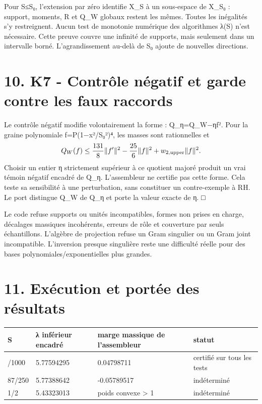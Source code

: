 \documentclass[
  10pt,
  a4paper,
]{article}
\begin{document}
Pour S≤S₀, l'extension par zéro identifie X\_S à un sous-espace de X\_S₀
: support, moments, R et Q\_W globaux restent les mêmes. Toutes les
inégalités s'y restreignent. Aucun test de monotonie numérique des
algorithmes λ(S) n'est nécessaire. Cette preuve couvre une infinité de
supports, mais seulement dans un intervalle borné. L'agrandissement
au-delà de S₀ ajoute de nouvelles directions.

\hypertarget{k7---contruxf4le-nuxe9gatif-et-garde-contre-les-faux-raccords}{%
\section{10. K7 - Contrôle négatif et garde contre les faux
raccords}\label{k7---contruxf4le-nuxe9gatif-et-garde-contre-les-faux-raccords}}

Le contrôle négatif modifie volontairement la forme :
Q\_η=Q\_W−η\textbar\textbar f\textbar\textbar². Pour la graine
polynomiale f=P(1−x²/S₀²)⁴, les masses sont rationnelles et \[
Q_W(f)\le\frac{131}{8}\|f'\|^2-\frac{25}{6}\|f\|^2
+w_{2,\rm upper}\|f\|^2.
\] Choisir un entier η strictement supérieur à ce quotient majoré
produit un vrai témoin négatif encadré de Q\_η. L'assembleur ne certifie
pas cette forme. Cela teste sa sensibilité à une perturbation, sans
constituer un contre-exemple à RH. Le port distingue Q\_W de Q\_η et
porte la valeur exacte de η. □

Le code refuse supports ou unités incompatibles, formes non prises en
charge, décalages massiques incohérents, erreurs de rôle et couverture
par seuls échantillons. L'algèbre de projection refuse un Gram singulier
ou un Gram joint incompatible. L'inversion presque singulière reste une
difficulté réelle pour des bases polynomiales/exponentielles plus
grandes.

\hypertarget{exuxe9cution-et-portuxe9e-des-ruxe9sultats}{%
\section{11. Exécution et portée des
résultats}\label{exuxe9cution-et-portuxe9e-des-ruxe9sultats}}

\begin{longtable}[]{@{}llll@{}}
\toprule\noalign{}
S & λ inférieur encadré & marge massique de l'assembleur & statut \\
\midrule\noalign{}
\endhead
\bottomrule\noalign{}
\endlastfoot
347/1000 & 5.77594295 & 0.04798711 & certifié sur tous les tests \\
87/250 & 5.77388642 & -0.05789517 & indéterminé \\
1/2 & 5.43323013 & poids convexe \textgreater{} 1 & indéterminé \\
\end{longtable}
\end{document}
